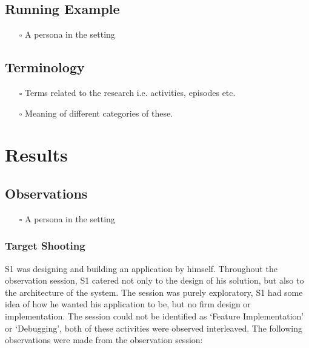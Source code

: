 \subsection{Running Example}
\begin{itemize}
\item[$\square$]A persona in the setting
\end{itemize}

\subsection{Terminology}
\begin{itemize}
\item[$\square$]Terms related to the research i.e. activities, episodes etc.
\item[$\square$]Meaning of different categories of these.
\end{itemize}

\section{Results}

\subsection{Observations}
\begin{itemize}
\item[$\square$]A persona in the setting
\end{itemize}
\subsubsection{Target Shooting}

S1 was designing and building an application by himself. Throughout the observation session, S1 catered not only to the design of his solution, but also to the architecture of the system. The session was purely exploratory, S1 had some idea of how he wanted his application to be, but no firm design or implementation. The session could not be identified as `Feature Implementation' or `Debugging', both of these activities were observed interleaved. The following observations were made from the observation session:

